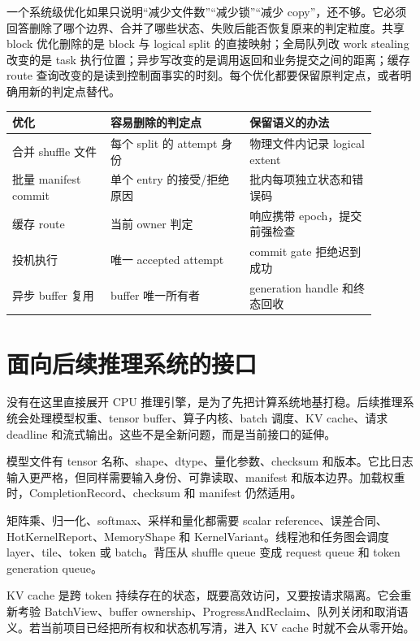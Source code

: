 一个系统级优化如果只说明“减少文件数”“减少锁”“减少 copy”，还不够。它必须回答删除了哪个边界、合并了哪些状态、失败后能否恢复原来的判定粒度。共享 block 优化删除的是 block 与 logical split 的直接映射；全局队列改 work stealing 改变的是 task 执行位置；异步写改变的是调用返回和业务提交之间的距离；缓存 route 查询改变的是读到控制面事实的时刻。每个优化都要保留原判定点，或者明确用新的判定点替代。

\begin{center}
\small
\begin{tabular}{@{}p{0.24\linewidth}p{0.34\linewidth}p{0.31\linewidth}@{}}
\toprule
优化 & 容易删除的判定点 & 保留语义的办法 \\
\midrule
合并 shuffle 文件 & 每个 split 的 attempt 身份 & 物理文件内记录 logical extent \\
批量 manifest commit & 单个 entry 的接受/拒绝原因 & 批内每项独立状态和错误码 \\
缓存 route & 当前 owner 判定 & 响应携带 epoch，提交前强检查 \\
投机执行 & 唯一 accepted attempt & commit gate 拒绝迟到成功 \\
异步 buffer 复用 & buffer 唯一所有者 & generation handle 和终态回收 \\
\bottomrule
\end{tabular}
\end{center}

\section{面向后续推理系统的接口}

没有在这里直接展开 CPU 推理引擎，是为了先把计算系统地基打稳。后续推理系统会处理模型权重、tensor buffer、算子内核、batch 调度、KV cache、请求 deadline 和流式输出。这些不是全新问题，而是当前接口的延伸。

模型文件有 tensor 名称、shape、dtype、量化参数、checksum 和版本。它比日志输入更严格，但同样需要输入身份、可靠读取、manifest 和版本边界。加载权重时，CompletionRecord、checksum 和 manifest 仍然适用。

矩阵乘、归一化、softmax、采样和量化都需要 scalar reference、误差合同、HotKernelReport、MemoryShape 和 KernelVariant。线程池和任务图会调度 layer、tile、token 或 batch。背压从 shuffle queue 变成 request queue 和 token generation queue。

KV cache 是跨 token 持续存在的状态，既要高效访问，又要按请求隔离。它会重新考验 BatchView、buffer ownership、ProgressAndReclaim、队列关闭和取消语义。若当前项目已经把所有权和状态机写清，进入 KV cache 时就不会从零开始。

